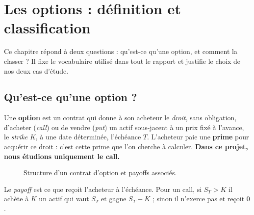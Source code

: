 \chapter{Les options : définition et classification}

Ce chapitre répond à deux questions : qu'est-ce qu'une option, et comment la classer ? Il fixe le vocabulaire utilisé dans tout le rapport et justifie le choix de nos deux cas d'étude.

\section{Qu'est-ce qu'une option ?}

Une \textbf{option} est un contrat qui donne à son acheteur le \emph{droit}, sans obligation, d'acheter (\emph{call}) ou de vendre (\emph{put}) un actif sous-jacent à un prix fixé à l'avance, le \emph{strike} $K$, à une date déterminée, l'échéance $T$. L'acheteur paie une \textbf{prime} pour acquérir ce droit : c'est cette prime que l'on cherche à calculer. \textbf{Dans ce projet, nous étudions uniquement le call.}

\begin{figure}[H]
\centering
{}
\caption{Structure d'un contrat d'option et payoffs associés.}
\end{figure}

Le \emph{payoff} est ce que reçoit l'acheteur à l'échéance. Pour un call, si $S_T>K$ il achète à $K$ un actif qui vaut $S_T$ et gagne $S_T-K$ ; sinon il n'exerce pas et reçoit $0$.

